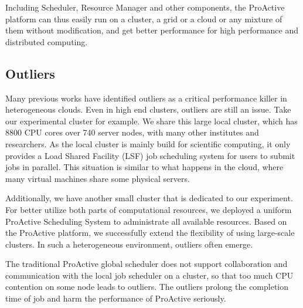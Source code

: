 Including Scheduler, Resource Manager and other components, the ProActive platform can
thus easily run on a cluster, a grid or a cloud or any mixture of them without
modification, and get better performance for high performance and distributed computing.

\subsection{Outliers}

Many previous works have identified outliers as a critical performance killer in
heterogeneous clouds. Even in high end clusters, outliers are still an issue. Take our
experimental cluster for example. We share this large local cluster, which has 8800 CPU
cores over 740 server nodes, with many other institutes and researchers. As the local
cluster is mainly build for scientific computing, it only provides a Load Shared Facility
(LSF) job scheduling system for users to submit jobs in parallel. This situation is
similar to what happens in the cloud, where many virtual machines share some physical
servers.

Additionally, we have another small cluster that is dedicated to our experiment. For
better utilize both parts of computational resources, we deployed a uniform ProActive
Scheduling System to administrate all available resources. Based on the ProActive
platform, we successfully extend the flexibility of using large-scale clusters. In such a
heterogeneous environment, outliers often emerge.

The traditional ProActive global scheduler does not support collaboration and
communication with the local job scheduler on a cluster, so that too much CPU contention
on some node leads to outliers. The outliers prolong the completion time of job and harm
the performance of ProActive seriously.
